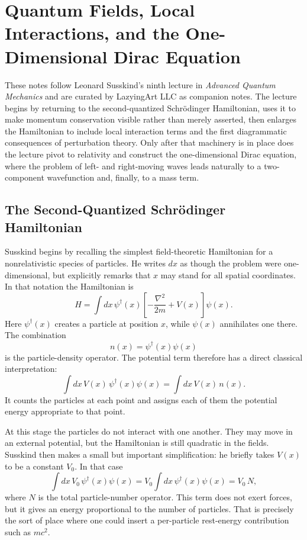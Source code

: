 \chapter{Quantum Fields, Local Interactions, and the One-Dimensional Dirac Equation}

These notes follow Leonard Susskind's ninth lecture in \emph{Advanced Quantum Mechanics} and are curated by LazyingArt LLC as companion notes. The lecture begins by returning to the second-quantized Schr\"odinger Hamiltonian, uses it to make momentum conservation visible rather than merely asserted, then enlarges the Hamiltonian to include local interaction terms and the first diagrammatic consequences of perturbation theory. Only after that machinery is in place does the lecture pivot to relativity and construct the one-dimensional Dirac equation, where the problem of left- and right-moving waves leads naturally to a two-component wavefunction and, finally, to a mass term.

\section{The Second-Quantized Schr\"odinger Hamiltonian}

Susskind begins by recalling the simplest field-theoretic Hamiltonian for a nonrelativistic species of particles. He writes \(dx\) as though the problem were one-dimensional, but explicitly remarks that \(x\) may stand for all spatial coordinates. In that notation the Hamiltonian is
\begin{equation}
H=\int dx\,\psi^\dagger(x)\left[-\frac{\nabla^2}{2m}+V(x)\right]\psi(x).
\end{equation}
Here \(\psi^\dagger(x)\) creates a particle at position \(x\), while \(\psi(x)\) annihilates one there. The combination
\begin{equation}
n(x)=\psi^\dagger(x)\psi(x)
\end{equation}
is the particle-density operator. The potential term therefore has a direct classical interpretation:
\begin{equation}
\int dx\,V(x)\,\psi^\dagger(x)\psi(x)
=
\int dx\,V(x)\,n(x).
\end{equation}
It counts the particles at each point and assigns each of them the potential energy appropriate to that point.

At this stage the particles do not interact with one another. They may move in an external potential, but the Hamiltonian is still quadratic in the fields. Susskind then makes a small but important simplification: he briefly takes \(V(x)\) to be a constant \(V_0\). In that case
\begin{equation}
\int dx\,V_0\,\psi^\dagger(x)\psi(x)=V_0\int dx\,\psi^\dagger(x)\psi(x)=V_0\,N,
\end{equation}
where \(N\) is the total particle-number operator. This term does not exert forces, but it gives an energy proportional to the number of particles. That is precisely the sort of place where one could insert a per-particle rest-energy contribution such as \(mc^2\).

